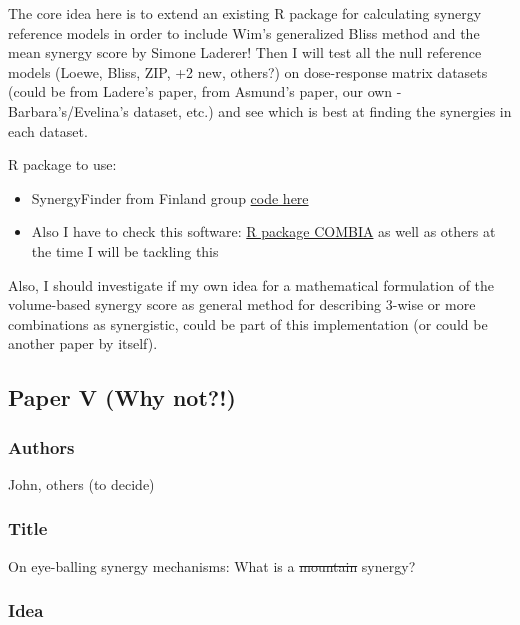 \documentclass[12pt,]{book}
\providecommand{\tightlist}{%
  \setlength{\itemsep}{0pt}\setlength{\parskip}{0pt}}
\begin{document}
The core idea here is to extend an existing R package for calculating synergy
reference models in order to include Wim's generalized Bliss method and the mean synergy score by Simone Laderer! Then I will test all the null reference models (Loewe, Bliss, ZIP, +2 new, others?) on dose-response matrix datasets (could be from Ladere's paper, from Asmund's paper, our own - Barbara's/Evelina's dataset, etc.) and see which is best at finding the synergies in each dataset.

R package to use:

\begin{itemize}
\tightlist
\item
  SynergyFinder from Finland group \href{https://github.com/google/synergyfinderengineered/}{code here}
\item
  Also I have to check this software: \href{https://www.ncbi.nlm.nih.gov/pmc/articles/PMC5732778/}{R package COMBIA} as well as others at the time I will be tackling this
\end{itemize}

Also, I should investigate if my own idea for a mathematical
formulation of the volume-based synergy score as general method for describing 3-wise
or more combinations as synergistic, could be part of this implementation (or could be another paper by itself).

\hypertarget{paper-v-why-not}{%
\subsection*{Paper V (Why not?!)}\label{paper-v-why-not}}

\hypertarget{authors-3}{%
\subsubsection*{Authors}\label{authors-3}}

John, others (to decide)

\hypertarget{title-1}{%
\subsubsection*{Title}\label{title-1}}

On eye-balling synergy mechanisms: What is a \sout{mountain} synergy?

\hypertarget{idea-3}{%
\subsubsection*{Idea}\label{idea-3}}
\end{document}
